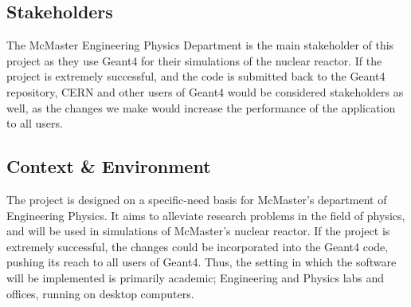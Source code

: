 \documentclass[12pt]{article}
\newcommand{\todo}[1]{\textcolor{red}{[TODO: #1]}} \else
\newcommand{\authornote}[3]{} \newcommand{\todo}[1]{} \fi
\newcommand{\ds}[1]{\authornote{blue}{DS}{#1}} %
\begin{document}
\subsection*{Stakeholders}
The McMaster Engineering Physics Department is
the main stakeholder of this project as they use Geant4 for their simulations
of the nuclear reactor. If the project is extremely successful, and the code is submitted back to the Geant4 repository, CERN and other users of Geant4 would be considered stakeholders as well, as the changes we make would increase the performance of the application to all users.\\

\subsection*{Context \& Environment}
The project is designed on a 
specific-need basis for McMaster's department of Engineering Physics. It aims to alleviate research problems in the field of physics, and will be used in simulations of McMaster's nuclear reactor. If the project is extremely successful, the changes could be incorporated into the Geant4 code, pushing its reach to all users of Geant4. Thus, the setting in which the software will be implemented is primarily academic; Engineering and Physics labs and offices, running on desktop computers. \ds{This last sentence is a bit awkward.} \authornote{green}{SD}{Removed awkward sentence}\\
 
\end{document}
